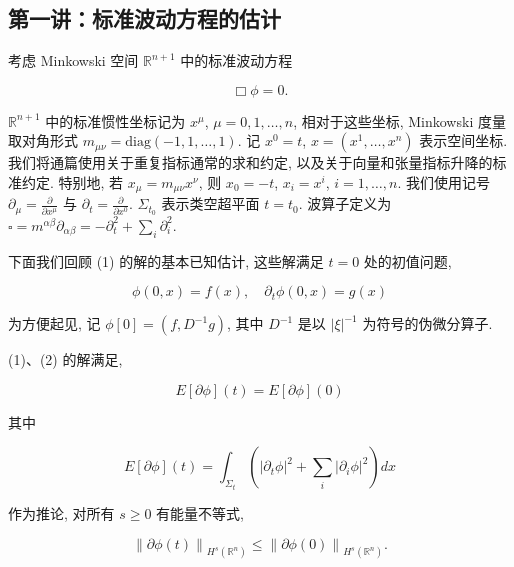 \subsection{第一讲：标准波动方程的估计}

考虑 Minkowski 空间 $\mathbb{R}^{n+1}$ 中的标准波动方程

\begin{equation}
\Box \phi = 0.\label{eq:cG-1}
\end{equation}

$\mathbb{R}^{n+1}$ 中的标准惯性坐标记为 $x^{\mu}$, $\mu = 0, 1, \dots , n$, 相对于这些坐标, Minkowski 度量取对角形式 $m_{\mu \nu} = \mathrm{diag}(-1, 1, \dots , 1)$. 记 $x^0 = t$, $x = (x^{1}, \ldots , x^{n})$ 表示空间坐标. 我们将通篇使用关于重复指标通常的求和约定, 以及关于向量和张量指标升降的标准约定. 特别地, 若 $x_{\mu} = m_{\mu \nu}x^{\nu}$, 则 $x_0 = -t$, $x_{i} = x^{i}$, $i = 1, \dots , n$. 我们使用记号 $\partial_{\mu} = \frac{\partial}{\partial x^{\mu}}$ 与 $\partial_t = \frac{\partial}{\partial x^0}$. $\Sigma_{t_0}$ 表示类空超平面 $t = t_0$. 波算子定义为 $\square = m^{\alpha \beta}\partial_{\alpha \beta} = -\partial_t^2 + \sum_i\partial_i^2$. 

下面我们回顾 (1) 的解的基本已知估计, 这些解满足 $t = 0$ 处的初值问题, 

\begin{equation}
\phi (0,  x) = f (x),  \quad \partial_ {t} \phi (0,  x) = g (x)\label{eq:cG-2}
\end{equation}

为方便起见, 记 $\phi[0] = (f,  D^{-1}g)$, 其中 $D^{-1}$ 是以 $|\xi|^{-1}$ 为符号的伪微分算子. 

\begin{proposition}\label{prop:cG-1.1}
(1)、(2) 的解满足, 

\begin{equation}
E [ \partial \phi ] (t) = E [ \partial \phi ] (0)\label{eq:cG-3}
\end{equation}

其中

\begin{equation}
E [ \partial \phi ] (t) = \int_ {\Sigma_ {t}} \left(|\partial_ {t} \phi | ^ {2} + \sum_ {i} | \partial_ {i} \phi | ^ {2}\right) d x\label{eq:cG-4}
\end{equation}

作为推论, 对所有 $s \geq 0$ 有能量不等式, 

\[
\left\| \partial \phi (t) \right\| _ {H ^ {s} (\mathbb {R} ^ {n})} \leq \left\| \partial \phi (0) \right\| _ {H ^ {s} (\mathbb {R} ^ {n})}.
\]
\end{proposition}

